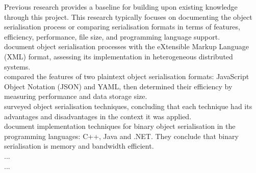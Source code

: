 \documentclass[../report.tex]{subfiles}
\begin{document}
Previous research provides a baseline for building upon existing knowledge through this project. This research typically focuses on documenting the object serialisation process or comparing serialisation formats in terms of features, efficiency, performance, file size, and programming language support. \\

\cite{goff2001xmlserialization} document object serialisation processes with the eXtensible Markup Language (XML) format, assessing its implementation in heterogeneous distributed systems. \\

\cite{eriksson2011comparison} compared the features of two plaintext object serialisation formats: JavaScript Object Notation (JSON) and YAML, then determined their efficiency by measuring performance and data storage size. \\

\cite{kazuaki2011survey} surveyed object serialisation techniques, concluding that each technique had its advantages and disadvantages in the context it was applied. \\

\cite{tauro2012binary} document implementation techniques for binary object serialisation in the programming languages: C++, Java and .NET. They conclude that binary serialisation is memory and bandwidth efficient. \\

\cite{sumaray2012efficiency} ... \\

\cite{vanura2018performance} ...
\end{document}
